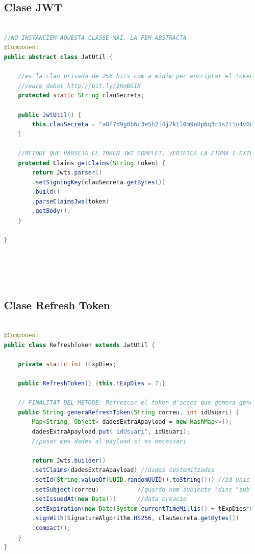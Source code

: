 \documentclass[a4paper,12pt]{report}
\begin{document}
	
\subsection{Clase JWT}


\begin{lstlisting}[language=Java, basicstyle=\ttfamily\tiny, keywordstyle=\color{magenta}]
	
//NO INSTANCIEM AQUESTA CLASSE MAI. LA FEM ABSTRACTA
@Component
public abstract class JwtUtil {
	
	//es la clau privada de 256 bits com a minim per encriptar el token (tant el d'acces com el de refresh)
	//veure debat http://bit.ly/3RmBGIK
	protected static String clauSecreta;
	
	public JwtUtil() {
		this.clauSecreta = "a8f7d9g0b6c3e5h2i4j7k1l0m9n8p6q3r5s2t1u4v0w9x8y7z";
	}
	
	//METODE QUE PARSEJA EL TOKEN JWT COMPLET. VERIFICA LA FIRMA I EXTRAU LES CLAIMS (parells clau valor en el payload).
	protected Claims getClaims(String token) {
		return Jwts.parser()
		.setSigningKey(clauSecreta.getBytes())
		.build()
		.parseClaimsJws(token)
		.getBody();
	}
	
}






\end{lstlisting}


				

\subsection{Clase Refresh Token}

\begin{lstlisting}[language=Java, basicstyle=\ttfamily\tiny, keywordstyle=\color{magenta}]

@Component
public class RefreshToken extends JwtUtil {
	
	private static int tExpDies;
	
	public RefreshToken() {this.tExpDies = 7;}
	
	// FINALITAT DEL METODE: Refrescar el token d'acces que genera generaAccesToken().
	public String generaRefreshToken(String correu, int idUsuari) {
		Map<String, Object> dadesExtraApayload = new HashMap<>();
		dadesExtraApayload.put("idUsuari", idUsuari);
		//posar mes dades al payload si es necessari
		
		return Jwts.builder()
		.setClaims(dadesExtraApayload) //dades customitzades
		.setId(String.valueOf(UUID.randomUUID().toString())) //id unic per a token. Per traSSSabilitat
		.setSubject(correu)           //guardo nom subjecte (dins "sub")
		.setIssuedAt(new Date())      //data creacio
		.setExpiration(new Date(System.currentTimeMillis() + tExpDies*86400*1000))  //expiracio
		.signWith(SignatureAlgorithm.HS256, clauSecreta.getBytes())
		.compact();
	}
}

\end{lstlisting}
\end{document}
